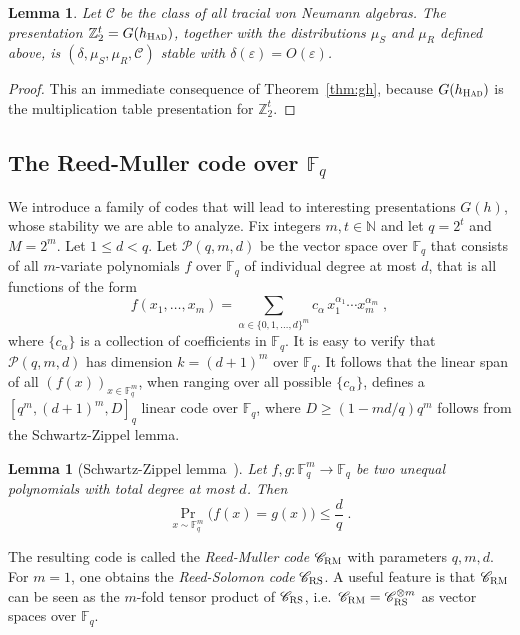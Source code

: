 \documentclass[11pt]{article}
\newtheorem{lemma}[theorem]{Lemma}
\theoremstyle{definition}
\newcommand{\code}{\mathscr{C}}
\newcommand{\N}{\ensuremath{\mathbb{N}}}
\newcommand{\F}{\ensuremath{\mathbb{F}}}
\newcommand{\Z}{\ensuremath{\mathbb{Z}}}
\newcommand{\mC}{\ensuremath{\mathcal{C}}}
\newcommand{\mP}{\ensuremath{\mathcal{P}}}
\newcommand{\RM}{\ensuremath{\textsc{RM}}}
\newcommand{\RS}{\ensuremath{\textsc{RS}}}
\newcommand{\had}{\textsc{Had}}
\newcommand{\eps}{\varepsilon}
\begin{document}
\begin{lemma}\label{lem:had-stab}
Let $\mC$ be the class of all tracial von Neumann algebras. 
The presentation $\Z_2^t= G(h_\had)$, together with the distributions $\mu_S$ and $\mu_R$ defined above, is $(\delta,\mu_S,\mu_R,\mC)$ stable with $\delta(\eps)=O(\eps)$. 
\end{lemma}

\begin{proof}
This an immediate consequence of Theorem~\ref{thm:gh}, because $G(h_\had)$ is the multiplication table presentation for $\Z_2^t$.
\end{proof}



\subsection{The Reed-Muller code over $\F_q$}
\label{sec:rmq}

We introduce a family of codes that will lead to interesting presentations $G(h)$, whose stability we are able to analyze.
Fix integers $m,t \in \N$ and let $q=2^t$ and $M = 2^m$. Let $1\leq d < q$. Let $\mP(q,m,d)$ be the vector space over $\F_q$ that consists of all $m$-variate polynomials $f$ over $\F_q$ of individual degree at most $d$, that is all functions of the form
\[
	f(x_1,\ldots,x_m) = \sum_{\alpha \in \{0,1,\ldots,d\}^m} c_\alpha\,
  x_1^{\alpha_1} \cdots x_m^{\alpha_m}\;,
\]
where $\{c_\alpha\}$ is a collection of coefficients in $\F_q$. It is easy to verify that $\mP(q,m,d)$ has dimension $k = (d+1)^m$ over $\F_q$. It follows that the linear span of all $(f(x))_{x\in \F_q^m}$, when ranging over all possible $\{c_\alpha\}$, defines a $[q^m,(d+1)^m,D]_q$ linear code over $\F_q$, where $D\geq (1-md/q)q^m$ follows from the Schwartz-Zippel lemma.

\begin{lemma}[Schwartz-Zippel lemma~\cite{Sch80,Zip79}]
  \label{lem:schwartz-zippel}
  Let $f, g: \F_q^m \to \F_q$ be two unequal polynomials with total degree at most $d$. Then
  \begin{equation*}
    \Pr_{x \sim \F_q^m}\big(f(x) = g(x)\big) \leq \frac{d}{q}\;.
  \end{equation*}
\end{lemma}

The resulting code is called the \emph{Reed-Muller code} $\code_\RM$ with parameters $q,m,d$. For $m=1$, one obtains the \emph{Reed-Solomon code} $\code_\RS$. A useful feature is that $\code_\RM$ can be seen as the $m$-fold tensor product of $\code_\RS$, i.e.\ $\code_\RM = \code_\RS^{\otimes m}$ as vector spaces over $\F_q$. 
\end{document}
